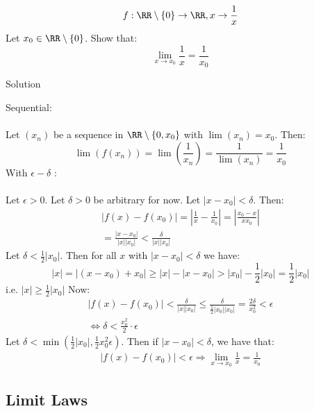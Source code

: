 \documentclass[class=scrartcl, crop=false]{standalone}
\begin{document}
\begin{example}
  \[
    f: \RR \setminus \{0\} \to \RR, x \to \frac{1}{x}
  \]
  Let $x_0 \in \RR \setminus \{0\}$. Show that:
  \[
    \lim_{x \to x_0} \frac{1}{x} = \frac{1}{x_0}
  \]
  \begin{soln}
    Solution
    \begin{enumerate}
      \ii[]
      \ii Sequential:
      \\\\
      Let $(x_n)$ be a sequence in $\RR \setminus \{0, x_0\}$ with $\lim(x_n) = x_0$. Then:
      \[
        \lim(f(x_n)) = \lim(\frac{1}{x_n}) = \frac{1}{\lim(x_n)} = \frac{1}{x_0}
      \]
      \ii With $\epsilon-\delta$ :
      \\\\
      Let $\epsilon > 0$. Let $\delta > 0$ be arbitrary for now. Let $|x - x_0| < \delta$. Then:
      \begin{gather*}
        |f(x) - f(x_0)| = |\frac{1}{x} - \frac{1}{x_0}| = |\frac{x_0 - x}{x x_0}| \\
        = \frac{|x - x_0|}{|x||x_0|} < \frac{\delta}{|x||x_0|}
      \end{gather*}
      Let $\delta < \frac{1}{2}|x_0|$. Then for all $x$ with $|x - x_0| < \delta$ we have:
      \[
        |x| = |(x - x_0) + x_0| \geq |x| - |x - x_0| > |x_0| - \frac{1}{2}|x_0| = \frac{1}{2}|x_0|
      \]
      i.e. $|x| \geq \frac{1}{2}|x_0|$ Now:
      \begin{gather*}
        |f(x) - f(x_0)| < \frac{\delta}{|x||x_0|} \leq \frac{\delta}{\frac{1}{2}|x_0||x_0|} = \frac{2\delta}{x_0^2} < \epsilon \\
        \Leftrightarrow \delta < \frac{x_0^2}{2} \cdot \epsilon
      \end{gather*}
      Let $\delta < \min(\frac{1}{2}|x_0|, \frac{1}{2}x_0^2\epsilon)$. Then if $|x - x_0| < \delta$, we have that:
      \begin{gather*}
        |f(x) - f(x_0)| < \epsilon \Rightarrow \lim_{x \to x_0} \frac{1}{x} = \frac{1}{x_0}
      \end{gather*} 
    \end{enumerate} 
  \end{soln} 
\end{example} 

\subsection{Limit Laws}
\end{document}
